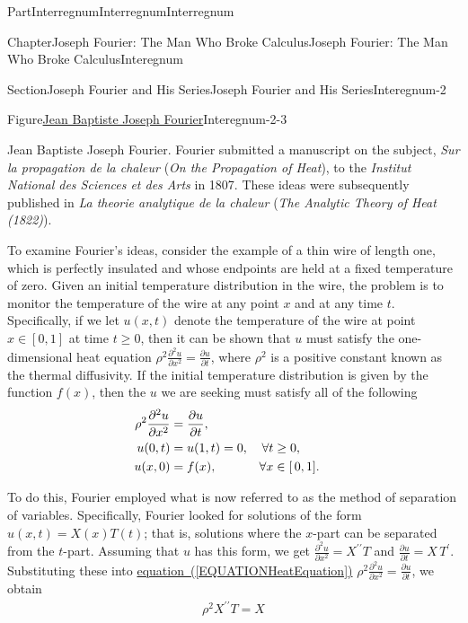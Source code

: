 \documentclass[oneside,10pt,]{book}
\newcommand{\xreffont}{\relax}
\numberwithin{equation}{part}
\newcommand{\amp}{&}
\begin{document}
\begin{partptx}{Part}{Interregnum}{}{Interregnum}{}{}{Interregnum}
\begin{chapterptx}{Chapter}{Joseph Fourier: The Man Who Broke Calculus}{}{Joseph Fourier: The Man Who Broke Calculus}{}{}{Interegnum}
\begin{sectionptx}{Section}{Joseph Fourier and His Series}{}{Joseph Fourier and His Series}{}{}{Interegnum-2}
\begin{figureptx}{Figure}{\href{https://mathshistory.st-andrews.ac.uk/Biographies/Fourier/}{Jean Baptiste Joseph Fourier}\protect\footnotemark{}}{Interegnum-2-3}{}
\begin{image}{0.325}{0.35}{0.325}{}
\end{image}%
\tcblower
\end{figureptx}%
%
 Jean Baptiste Joseph Fourier.  Fourier submitted a manuscript on the subject, \textit{Sur la propagation de la chaleur} (\emph{On the Propagation of Heat}), to the \textit{Institut National des Sciences et des Arts} in 1807.  These ideas were subsequently published in \textit{La theorie analytique de la chaleur} (\emph{The Analytic Theory of Heat (1822)}).%
\par
To examine Fourier's ideas, consider the example of a thin wire of length one, which is perfectly insulated and whose endpoints are held at a fixed temperature of zero. Given an initial temperature distribution in the wire, the problem is to monitor the temperature of the wire at any point \(x\) and at any time \(t\). Specifically, if we let \(u(x,t)\) denote the temperature of the wire at point \(x\in[0,1]\) at time \(t\geq 0\), then it can be shown that \(u\) must satisfy the one-dimensional heat equation \(\rho^2\frac{\partial^2u}{\partial x^2}=\frac{\partial u}{\partial t}\), where \(\rho^2\) is a positive constant known as the thermal diffusivity. If the initial temperature distribution is given by the function \(f(x)\), then the \(u\) we are seeking must satisfy all of the following%
\begin{align}
\rho^2\frac{\partial^2u}{\partial x^2}\amp{}=\frac{\partial u}{\partial t},\amp{}\label{EQUATIONHeatEquation}\\
u(0,t)\amp{} =u(1,t)=0,  
\amp{}
\forall t\amp{}\geq 0,\notag\\
u(x,0)\amp{} =f(x), 
\amp{}
\forall x\amp{}\in[\,0,1].\notag
\end{align}
%
\par
To do this, Fourier employed what is now referred to as the method of separation of variables.  Specifically, Fourier looked for solutions of the form \(u(x,t)=X(x)T(t)\); that is, solutions where the \(x\)-part can be separated from the \(t\)-part.  Assuming that \(u\) has this form, we get \(\frac{\partial^2u}{\partial x^2}=X^{\prime\prime}T\) and \(\frac{\partial u}{\partial t}=X\,T^{\prime}\).  Substituting these into \hyperref[EQUATIONHeatEquation]{equation~({\xreffont\ref{EQUATIONHeatEquation}})} \(\rho^2\frac{\partial^2u}{\partial x^2}=\frac{\partial
u}{\partial t}\), we obtain%
\begin{align*}
\rho^2X^{\prime\prime}T=X

\end{align*}
\end{sectionptx}
\end{chapterptx}
\end{partptx}
\end{document}

